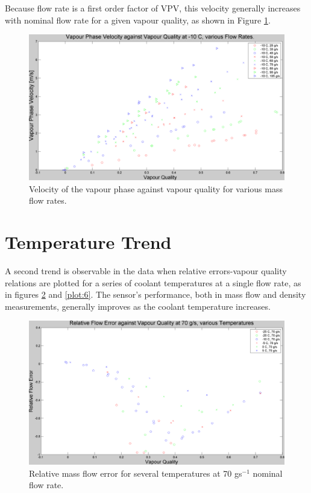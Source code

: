 \documentclass{report}
\begin{document}
\FloatBarrier
Because flow rate is a first order factor of VPV, this velocity generally increases with nominal flow rate for a given vapour quality, as shown in Figure \ref{gasVelocity}.
\begin{figure}
\includegraphics[width=\textwidth]{plots/fig12}
\caption{Velocity of the vapour phase against vapour quality for various mass flow rates.}
\label{gasVelocity}
\end{figure}

\FloatBarrier
\section{Temperature Trend}
A second trend is observable in the data when relative errors-vapour quality relations are plotted for a series of coolant temperatures  at a single flow rate, as in figures \ref{plot:5} and \ref{plot:6}. The sensor's performance, both in mass flow and density measurements, generally improves as the coolant temperature increases.
\FloatBarrier
\begin{figure}
\includegraphics[width=\textwidth]{plots/fig5}
\caption{Relative mass flow error for several temperatures at 70 gs$^{-1}$ nominal flow rate.}
\label{plot:5}
\end{figure}
\end{document}
